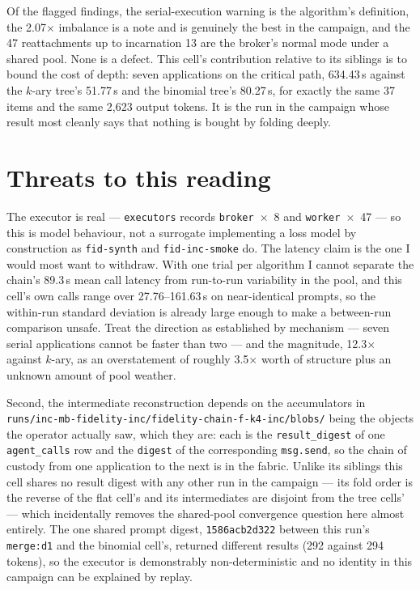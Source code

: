 \documentclass[11pt]{article}
\begin{document}
Of the flagged findings, the serial-execution warning is the algorithm's definition, the
2.07$\times$ imbalance is a note and is genuinely the best in the campaign, and the 47
reattachments up to incarnation 13 are the broker's normal mode under a shared pool. None
is a defect. This cell's contribution relative to its siblings is to bound the cost of
depth: seven applications on the critical path, 634.43\,s against the $k$-ary tree's
51.77\,s and the binomial tree's 80.27\,s, for exactly the same 37 items and the same
2{,}623 output tokens. It is the run in the campaign whose result most cleanly says that
nothing is bought by folding deeply.

\section{Threats to this reading}

The executor is real --- \texttt{executors} records \texttt{broker}~$\times$~8 and
\texttt{worker}~$\times$~47 --- so this is model behaviour, not a surrogate implementing a
loss model by construction as \texttt{fid-synth} and \texttt{fid-inc-smoke} do. The
latency claim is the one I would most want to withdraw. With one trial per algorithm I
cannot separate the chain's 89.3\,s mean call latency from run-to-run variability in the
pool, and this cell's own calls range over 27.76--161.63\,s on near-identical prompts, so
the within-run standard deviation is already large enough to make a between-run comparison
unsafe. Treat the direction as established by mechanism --- seven serial applications
cannot be faster than two --- and the magnitude, 12.3$\times$ against $k$-ary, as an
overstatement of roughly 3.5$\times$ worth of structure plus an unknown amount of pool
weather.

Second, the intermediate reconstruction depends on the accumulators in
\texttt{runs/inc-mb-fidelity-inc/fidelity-chain-f-k4-inc/blobs/} being the objects the
operator actually saw, which they are: each is the \texttt{result\_digest} of one
\texttt{agent\_calls} row and the \texttt{digest} of the corresponding \texttt{msg.send},
so the chain of custody from one application to the next is in the fabric. Unlike its
siblings this cell shares no result digest with any other run in the campaign --- its fold
order is the reverse of the flat cell's and its intermediates are disjoint from the tree
cells' --- which incidentally removes the shared-pool convergence question here almost
entirely. The one shared prompt digest, \texttt{1586acb2d322} between this run's
\texttt{merge:d1} and the binomial cell's, returned different results (292 against 294
tokens), so the executor is demonstrably non-deterministic and no identity in this campaign
can be explained by replay.
\end{document}
